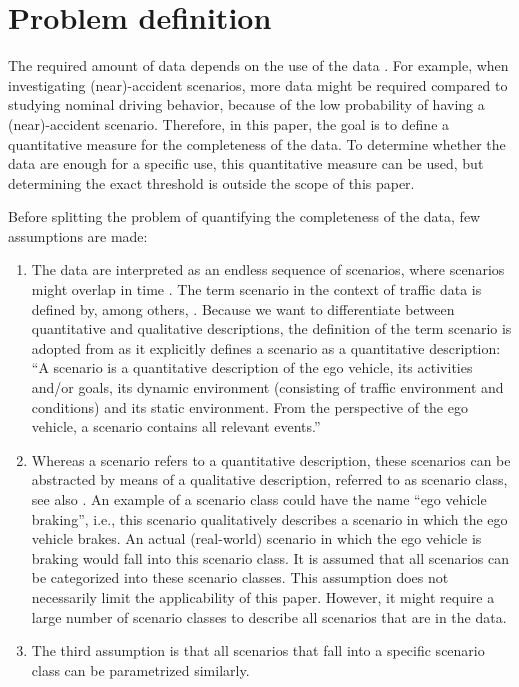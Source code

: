 \section{Problem definition}
\label{sec:problem}

The required amount of data depends on the use of the data \cite{wang2017much}. For example, when investigating (near)-accident scenarios, more data might be required compared to studying nominal driving behavior, because of the low probability of having a (near)-accident scenario. Therefore, in this paper, the goal is to define a quantitative measure for the completeness of the data. To determine whether the data are enough for a specific use, this quantitative measure can be used, but determining the exact threshold is outside the scope of this paper.


Before splitting the problem of quantifying the completeness of the data, few assumptions are made:
\begin{enumerate}
	\item The data are interpreted as an endless sequence of scenarios, where scenarios might overlap in time \cite{elrofai2018scenario}. The term scenario in the context of traffic data is defined by, among others, \textcite{geyer2014, ulbrich2015, elrofai2016scenario, elrofai2018scenario}. Because we want to differentiate between quantitative and qualitative descriptions, the definition of the term scenario is adopted from \textcite{elrofai2018scenario} as it explicitly defines a scenario as a quantitative description: ``A scenario is a quantitative description of the ego vehicle, its activities and/or goals, its dynamic environment (consisting of traffic environment and conditions) and its static environment. From the perspective of the ego vehicle, a scenario contains all relevant events.''
	
	\item Whereas a scenario refers to a quantitative description, these scenarios can be abstracted by means of a qualitative description, referred to as scenario class, see also \textcite{ploeg2018cetran, elrofai2018scenario}. An example of a scenario class could have the name ``ego vehicle braking'', i.e., this scenario qualitatively describes a scenario in which the ego vehicle brakes. An actual (real-world) scenario in which the ego vehicle is braking would fall into this scenario class. It is assumed that all scenarios can be categorized into these scenario classes. This assumption does not necessarily limit the applicability of this paper. However, it might require a large number of scenario classes to describe all scenarios that are in the data.
	
	\item The third assumption is that all scenarios that fall into a specific scenario class can be parametrized similarly. 
\end{enumerate}




